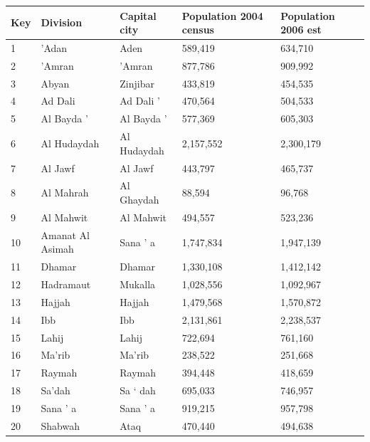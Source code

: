 \documentclass{article}
\begin{document}
\begin{tabular}{lllll}
\toprule
Key & Division & Capital city & Population 2004 census & Population 2006 est \\
\midrule
1 & 'Adan & Aden & 589,419 & 634,710 \\
2 & 'Amran & 'Amran & 877,786 & 909,992 \\
3 & Abyan & Zinjibar & 433,819 & 454,535 \\
4 & Ad Dali & Ad Dali ' & 470,564 & 504,533 \\
5 & Al Bayda ' & Al Bayda ' & 577,369 & 605,303 \\
6 & Al Hudaydah & Al Hudaydah & 2,157,552 & 2,300,179 \\
7 & Al Jawf & Al Jawf & 443,797 & 465,737 \\
8 & Al Mahrah & Al Ghaydah & 88,594 & 96,768 \\
9 & Al Mahwit & Al Mahwit & 494,557 & 523,236 \\
10 & Amanat Al Asimah & Sana ' a & 1,747,834 & 1,947,139 \\
11 & Dhamar & Dhamar & 1,330,108 & 1,412,142 \\
12 & Hadramaut & Mukalla & 1,028,556 & 1,092,967 \\
13 & Hajjah & Hajjah & 1,479,568 & 1,570,872 \\
14 & Ibb & Ibb & 2,131,861 & 2,238,537 \\
15 & Lahij & Lahij & 722,694 & 761,160 \\
16 & Ma'rib & Ma'rib & 238,522 & 251,668 \\
17 & Raymah & Raymah & 394,448 & 418,659 \\
18 & Sa'dah & Sa ` dah & 695,033 & 746,957 \\
19 & Sana ' a & Sana ' a & 919,215 & 957,798 \\
20 & Shabwah & Ataq & 470,440 & 494,638 \\
\bottomrule
\end{tabular}
\end{document}

